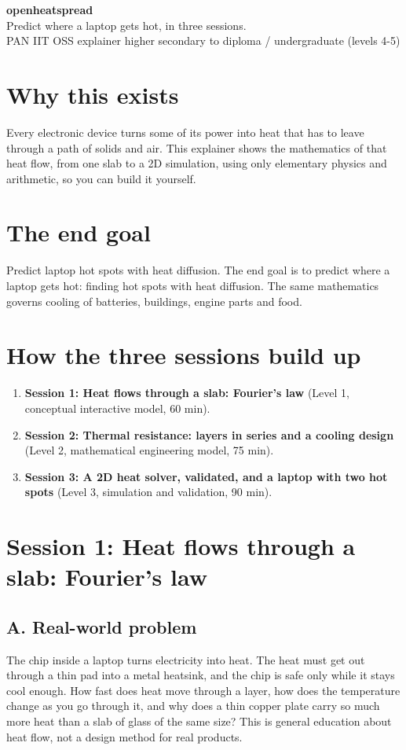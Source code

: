 \documentclass[11pt,a4paper]{article}
\begin{document}
\begin{center}{\LARGE\bfseries openheatspread}\\[0.4em]{\large Predict where a laptop gets hot, in three sessions.}\\[0.2em]\small PAN IIT OSS explainer \textbullet{} higher secondary to diploma / undergraduate (levels 4-5)\end{center}

\section*{Why this exists}
Every electronic device turns some of its power into heat that has to leave through a path of solids and air. This explainer shows the mathematics of that heat flow, from one slab to a 2D simulation, using only elementary physics and arithmetic, so you can build it yourself.

\section*{The end goal}
Predict laptop hot spots with heat diffusion. The end goal is to predict where a laptop gets hot: finding hot spots with heat diffusion. The same mathematics governs cooling of batteries, buildings, engine parts and food.

\section*{How the three sessions build up}
\begin{enumerate}[nosep]
\item \textbf{Session 1: Heat flows through a slab: Fourier's law} (Level 1, conceptual interactive model, 60 min).
\item \textbf{Session 2: Thermal resistance: layers in series and a cooling design} (Level 2, mathematical engineering model, 75 min).
\item \textbf{Session 3: A 2D heat solver, validated, and a laptop with two hot spots} (Level 3, simulation and validation, 90 min).
\end{enumerate}

\section{Session 1: Heat flows through a slab: Fourier's law}

\subsection*{A. Real-world problem}
The chip inside a laptop turns electricity into heat. The heat must get out through a thin pad into a metal heatsink, and the chip is safe only while it stays cool enough. How fast does heat move through a layer, how does the temperature change as you go through it, and why does a thin copper plate carry so much more heat than a slab of glass of the same size? This is general education about heat flow, not a design method for real products.
\end{document}
